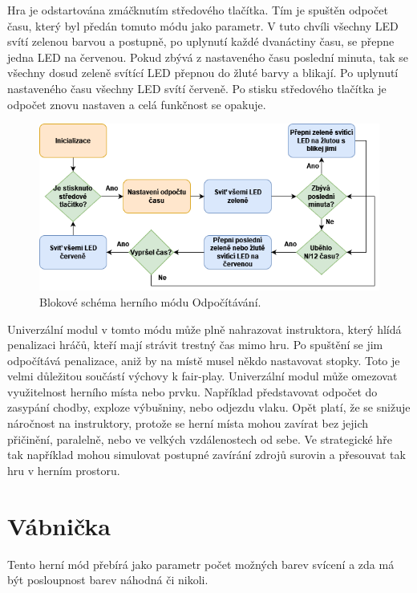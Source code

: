 Hra je odstartována zmáčknutím středového tlačítka. Tím je spuštěn odpočet času, který byl předán tomuto módu jako parametr. V tuto chvíli všechny LED svítí zelenou barvou a postupně, po uplynutí každé 
dvanáctiny času, se přepne jedna LED na červenou. Pokud zbývá z nastaveného času poslední minuta, tak se všechny dosud zeleně svítící LED přepnou do žluté barvy a blikají. Po uplynutí nastaveného času 
všechny LED svítí červeně. Po stisku středového tlačítka je odpočet znovu nastaven a celá funkčnost se opakuje.  

\begin{figure}[!h]
  \begin{center}
    \includegraphics[scale=0.65]{obrazky/Odpocitavani_diagram.png}
  \end{center}
  \caption[Blokové schéma herního módu Odpočítávání]{Blokové schéma herního módu Odpočítávání.}
\end{figure}

Univerzální modul v tomto módu může plně nahrazovat instruktora, který hlídá penalizaci hráčů, kteří mají strávit trestný čas mimo hru. Po spuštění se jim odpočítává penalizace, aniž by na místě musel 
někdo nastavovat stopky. Toto je velmi důležitou součástí výchovy k fair-play. Univerzální modul může omezovat využitelnost herního místa nebo prvku. Například představovat odpočet do zasypání chodby, 
exploze výbušniny, nebo odjezdu vlaku. Opět platí, že se snižuje náročnost na instruktory, protože se herní místa mohou zavírat bez jejich přičinění, paralelně, nebo ve velkých vzdálenostech od sebe. 
Ve strategické hře tak například mohou simulovat postupné zavírání zdrojů surovin a přesouvat tak hru v herním prostoru.

\section{Vábnička}
Tento herní mód přebírá jako parametr počet možných barev svícení a zda má být posloupnost barev náhodná či nikoli.

